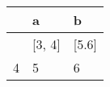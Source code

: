 \begin{tabular}{lll}
\hline
        & a      & b     \\
\hline
 [1, 2] & [3, 4] & [5.6] \\
 4      & 5      & 6     \\
\hline
\end{tabular}